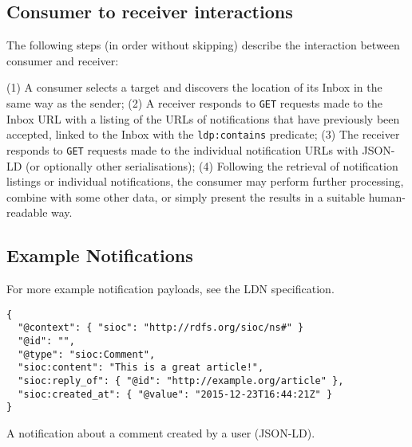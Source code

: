 \documentclass[a4paper]{llncs}
\begin{document}
                            

                            
                                \subsection{Consumer to receiver interactions}
  \label{consumer-to-receiver}

                                
                                    
\par The following steps (in order without skipping) describe the interaction between consumer and receiver:

                                    
\par (1) A consumer selects a target and discovers the location of its Inbox in the same way as the sender; (2) A receiver responds to {\tt GET} requests made to the Inbox URL with a listing of the URLs of notifications that have previously been accepted, linked to the Inbox with the {\tt ldp:contains} predicate; (3) The receiver responds to {\tt GET} requests made to the individual notification URLs with JSON-LD (or optionally other serialisations); (4) Following the retrieval of notification listings or individual notifications, the consumer may perform further processing, combine with some other data, or simply present the results in a suitable human-readable way.
                                
                            

                            
                                \subsection{Example Notifications}
  \label{example-notifications}

                                
                                    
\par For more example notification payloads, see the \empty LDN specification.

                                    
                                        \begin{verbatim}{
  "@context": { "sioc": "http://rdfs.org/sioc/ns#" }
  "@id": "",
  "@type": "sioc:Comment",
  "sioc:content": "This is a great article!",
  "sioc:reply_of": { "@id": "http://example.org/article" },
  "sioc:created_at": { "@value": "2015-12-23T16:44:21Z" }
}\end{verbatim}
                                        A notification about a comment created by a user (JSON-LD).
                                    
\end{document}
